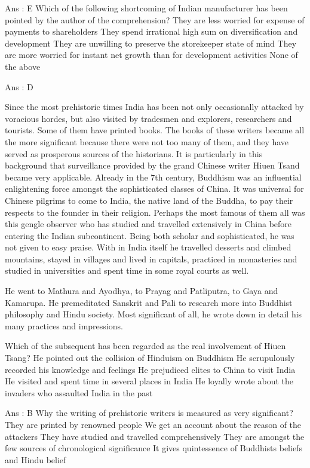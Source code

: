     Ans : E
    Which of the following shortcoming of Indian manufacturer has been pointed by the author of the comprehension?
        They are less worried for expense of payments to shareholders
        They spend irrational high sum on diversification and development
        They are unwilling to preserve the storekeeper state of mind
        They are more worried for instant net growth than for development activities
        None of the above 

    Ans : D 


Since the most prehistoric times India has been not only occasionally attacked by voracious hordes, but also visited by tradesmen and explorers, researchers and tourists. Some of them have printed books. The books of these writers became all the more significant because there were not too many of them, and they have served as prosperous sources of the historians. It is particularly in this background that surveillance provided by the grand Chinese writer Hiuen Tsand became very applicable. Already in the 7th century, Buddhism was an influential enlightening force amongst the sophisticated classes of China. It was universal for Chinese pilgrims to come to India, the native land of the Buddha, to pay their respects to the founder in their religion. Perhaps the most famous of them all was this gengle observer who has studied and travelled extensively in China before entering the Indian subcontinent. Being both scholar and sophisticated, he was not given to easy praise. With in India itself he travelled desserts and climbed mountains, stayed in villages and lived in capitals, practiced in monasteries and studied in universities and spent time in some royal courts as well.

He went to Mathura and Ayodhya, to Prayag and Patliputra, to Gaya and Kamarupa. He premeditated Sanskrit and Pali to research more into Buddhist philosophy and Hindu society. Most significant of all, he wrote down in detail his many practices and impressions.

    Which of the subsequent has been regarded as the real involvement of Hiuen Tsang?
        He pointed out the collision of Hinduism on Buddhism
        He scrupulously recorded his knowledge and feelings
        He prejudiced elites to China to visit India
        He visited and spent time in several places in India
        He loyally wrote about the invaders who assaulted India in the past 

    Ans : B
    Why the writing of prehistoric writers is measured as very significant?
        They are printed by renowned people
        We get an account about the reason of the attackers
        They have studied and travelled comprehensively
        They are amongst the few sources of chronological significance
        It gives quintessence of Buddhists beliefs and Hindu belief 


